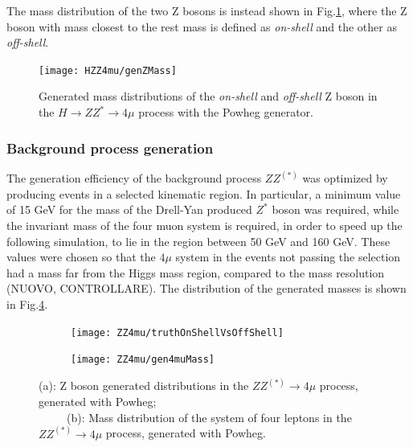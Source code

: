 \documentclass[a4paper,twoside,12pt]{article}
\begin{document}
The mass distribution of the two Z bosons is instead shown in Fig.\ref{fig:HZZ4mu:generatedZMass}, where the Z boson with mass closest to the rest mass
is defined as \textit{on-shell} and the other as \textit{off-shell}.

\begin{figure}
\centering
  \texttt{[image: HZZ4mu/genZMass]}
  \caption{Generated mass distributions of the \textit{on-shell} and \textit{off-shell} Z boson 
  in the $H \rightarrow ZZ^* \rightarrow 4\mu$ process with the Powheg generator.}
\label{fig:HZZ4mu:generatedZMass}
\end{figure}

\subsubsection{Background process generation}\label{physics:bkgGeneration}
The generation efficiency of the background process $ZZ^{(*)}$ was optimized by
producing events in a selected kinematic region. In particular, a minimum value of 15 GeV for the mass of
the Drell-Yan produced $Z^*$ boson was required, while the invariant mass of the four muon system is required,
in order to speed up the following simulation, 
to lie in the region between 50 GeV and 160 GeV. These values were chosen so that the $4\mu$ system in the events not passing the selection had a mass 
far from the Higgs mass region, compared to the mass resolution (NUOVO, CONTROLLARE). The distribution of the generated masses is shown 
in Fig.\ref{fig:ZZ4mu:genMasses}.\\

\begin{figure}
\begin{subfigure}{.5\linewidth}
\texttt{[image: ZZ4mu/truthOnShellVsOffShell]}
\caption{}
\label{fig:ZZ4mu:truthOnShellVsOffShell}
\end{subfigure}
\begin{subfigure}{.5\linewidth}
\centering
\texttt{[image: ZZ4mu/gen4muMass]}
\caption{}
\label{fig:ZZ4mu:gen4muMass}
\end{subfigure}
\caption{(a): Z boson generated distributions in the $ZZ^{(*)} \rightarrow 4\mu$ process, generated with Powheg;\\
\ \ \ \ \ (b): Mass distribution of the system of four leptons in the $ZZ^{(*)} \rightarrow 4\mu$ process, generated with Powheg.}
\label{fig:ZZ4mu:genMasses}
\end{figure}
\end{document}
